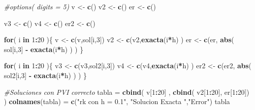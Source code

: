 \documentclass[]{article}
\newenvironment{Shaded}{\begin{snugshade}}{\end{snugshade}}
\newcommand{\KeywordTok}[1]{\textcolor[rgb]{0.13,0.29,0.53}{\textbf{#1}}}
\newcommand{\DecValTok}[1]{\textcolor[rgb]{0.00,0.00,0.81}{#1}}
\newcommand{\StringTok}[1]{\textcolor[rgb]{0.31,0.60,0.02}{#1}}
\newcommand{\CommentTok}[1]{\textcolor[rgb]{0.56,0.35,0.01}{\textit{#1}}}
\newcommand{\ControlFlowTok}[1]{\textcolor[rgb]{0.13,0.29,0.53}{\textbf{#1}}}
\newcommand{\OperatorTok}[1]{\textcolor[rgb]{0.81,0.36,0.00}{\textbf{#1}}}
\newcommand{\NormalTok}[1]{#1}
\begin{document}
\begin{Shaded}
\begin{Highlighting}[]
\CommentTok{#options( digits = 5)}
\NormalTok{v <-}\StringTok{ }\KeywordTok{c}\NormalTok{()}
\NormalTok{v2 <-}\StringTok{ }\KeywordTok{c}\NormalTok{()}
\NormalTok{er <-}\StringTok{ }\KeywordTok{c}\NormalTok{()}

\NormalTok{v3 <-}\StringTok{ }\KeywordTok{c}\NormalTok{()}
\NormalTok{v4 <-}\StringTok{ }\KeywordTok{c}\NormalTok{()}
\NormalTok{er2 <-}\StringTok{ }\KeywordTok{c}\NormalTok{()}

\ControlFlowTok{for}\NormalTok{( i }\ControlFlowTok{in} \DecValTok{1}\OperatorTok{:}\DecValTok{20}\NormalTok{ )\{}
\NormalTok{  v <-}\StringTok{ }\KeywordTok{c}\NormalTok{(v,sol[i,}\DecValTok{3}\NormalTok{])}
\NormalTok{  v2 <-}\StringTok{ }\KeywordTok{c}\NormalTok{(v2,}\KeywordTok{exacta}\NormalTok{(i}\OperatorTok{*}\NormalTok{h) )}
\NormalTok{  er <-}\StringTok{ }\KeywordTok{c}\NormalTok{(er, }\KeywordTok{abs}\NormalTok{( sol[i,}\DecValTok{3}\NormalTok{] }\OperatorTok{-}\StringTok{ }\KeywordTok{exacta}\NormalTok{(i}\OperatorTok{*}\NormalTok{h) ) )}
\NormalTok{\}}

\ControlFlowTok{for}\NormalTok{( i }\ControlFlowTok{in} \DecValTok{1}\OperatorTok{:}\DecValTok{20}\NormalTok{ )\{}
\NormalTok{  v3 <-}\StringTok{ }\KeywordTok{c}\NormalTok{(v3,sol2[i,}\DecValTok{3}\NormalTok{])}
\NormalTok{  v4 <-}\StringTok{ }\KeywordTok{c}\NormalTok{(v4,}\KeywordTok{exacta}\NormalTok{(i}\OperatorTok{*}\NormalTok{h) )}
\NormalTok{  er2 <-}\StringTok{ }\KeywordTok{c}\NormalTok{(er2, }\KeywordTok{abs}\NormalTok{( sol2[i,}\DecValTok{3}\NormalTok{] }\OperatorTok{-}\StringTok{ }\KeywordTok{exacta}\NormalTok{(i}\OperatorTok{*}\NormalTok{h) ) )}
\NormalTok{\}}


\CommentTok{#Soluciones con PVI correcto}
\NormalTok{tabla =}\StringTok{ }\KeywordTok{cbind}\NormalTok{( v[}\DecValTok{1}\OperatorTok{:}\DecValTok{20}\NormalTok{] , }\KeywordTok{cbind}\NormalTok{( v2[}\DecValTok{1}\OperatorTok{:}\DecValTok{20}\NormalTok{], er[}\DecValTok{1}\OperatorTok{:}\DecValTok{20}\NormalTok{]) )}
\KeywordTok{colnames}\NormalTok{(tabla) =}\StringTok{ }\KeywordTok{c}\NormalTok{(}\StringTok{"rk con h = 0.1"}\NormalTok{, }\StringTok{"Solucion Exacta "}\NormalTok{,}\StringTok{"Error"}\NormalTok{)}
\NormalTok{tabla}
\end{Highlighting}
\end{Shaded}
\end{document}
